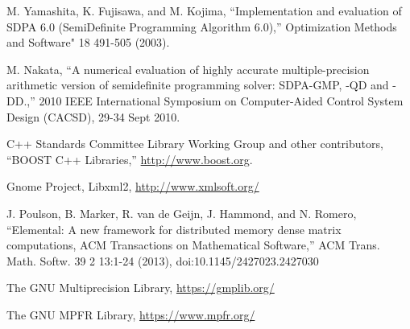 \documentclass[12pt]{article}
\numberwithin{equation}{section}
\begin{document}
\begin{thebibliography}{9}
  M. Yamashita, K. Fujisawa, and M. Kojima,
  ``Implementation and evaluation of SDPA 6.0 (SemiDefinite Programming Algorithm 6.0),''
  Optimization Methods and Software" 18 491-505 (2003).

  M. Nakata,
  ``A numerical evaluation of highly accurate multiple-precision arithmetic version of semidefinite programming solver: SDPA-GMP, -QD and -DD.,''
  2010 IEEE International Symposium on Computer-Aided Control System Design (CACSD), 29-34 Sept 2010.

  C++ Standards Committee Library Working Group and other contributors,
  ``BOOST C++ Libraries,''
  \href{http://www.boost.org}{http://www.boost.org}.

  Gnome Project,
  Libxml2,
  \href{http://www.xmlsoft.org/}{http://www.xmlsoft.org/}

  J. Poulson, B. Marker, R. van de Geijn, J. Hammond, and N. Romero,
  ``Elemental: A new framework for distributed memory dense matrix computations, ACM Transactions on Mathematical Software,''
  ACM Trans. Math. Softw. 39 2 13:1-24 (2013),
  doi:10.1145/2427023.2427030
  
  The GNU Multiprecision Library,
  \href{https://gmplib.org/}{https://gmplib.org/}

  The GNU MPFR Library,
  \href{https://www.mpfr.org/}{https://www.mpfr.org/}

\end{thebibliography}
\end{document}
